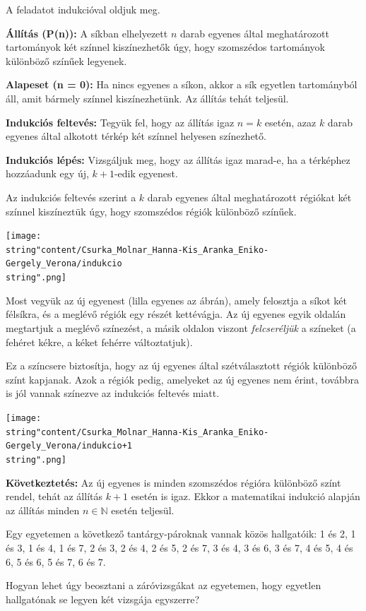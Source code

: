 \begin{solution}
	A feladatot indukcióval oldjuk meg.
	
	\textbf{Állítás (P(n)):} A síkban elhelyezett $n$ darab egyenes által
	meghatározott tartományok két színnel kiszínezhetők úgy, hogy szomszédos
	tartományok különböző színűek legyenek.
	
	\textbf{Alapeset (n = 0):} Ha nincs egyenes a síkon, akkor a sík egyetlen
	tartományból áll, amit bármely színnel kiszínezhetünk. Az állítás
	tehát teljesül.
	
	\textbf{Indukciós feltevés:} Tegyük fel, hogy az állítás igaz $n=k$
	esetén, azaz $k$ darab egyenes által alkotott térkép két színnel
	helyesen színezhető.
	
	\textbf{Indukciós lépés:} Vizsgáljuk meg, hogy az állítás igaz marad-e,
	ha a térképhez hozzáadunk egy új, $k+1$-edik egyenest.
	
	Az indukciós feltevés szerint a $k$ darab egyenes által meghatározott
	régiókat két színnel kiszíneztük úgy, hogy szomszédos régiók különböző
	színűek.
	\begin{center}
		\texttt{[image: \\string"content/Csurka\_Molnar\_Hanna-Kis\_Aranka\_Eniko-Gergely\_Verona/indukcio\\string".png]} 
		\par\end{center}
	Most vegyük az új egyenest (lilla egyenes az ábrán), amely felosztja
	a síkot két félsíkra, és a meglévő régiók egy részét kettévágja. Az
	új egyenes egyik oldalán megtartjuk a meglévő színezést, a másik oldalon
	viszont \textit{felcseréljük} a színeket (a fehéret kékre, a kéket
	fehérre változtatjuk).
	
	Ez a színcsere biztosítja, hogy az új egyenes által szétválasztott
	régiók különböző színt kapjanak. Azok a régiók pedig, amelyeket az
	új egyenes nem érint, továbbra is jól vannak színezve az indukciós
	feltevés miatt.
	\begin{center}
		\texttt{[image: \\string"content/Csurka\_Molnar\_Hanna-Kis\_Aranka\_Eniko-Gergely\_Verona/indukcio+1\\string".png]} 
	\end{center}
	\medskip{}
	
	\textbf{Következtetés:} Az új egyenes is minden szomszédos régióra
	különböző színt rendel, tehát az állítás $k+1$ esetén is igaz. Ekkor
	a matematikai indukció alapján az állítás minden $n\in\mathbb{N}$
	esetén teljesül. 
\end{solution}
\begin{problem}
	Egy egyetemen a következő tantárgy-pároknak vannak közös
	hallgatóik: 1 és 2, 1 és 3, 1 és 4, 1 és 7, 2 és 3, 2 és 4, 2 és 5,
	2 és 7, 3 és 4, 3 és 6, 3 és 7, 4 és 5, 4 és 6, 5 és 6, 5 és 7, 6
	és 7.
	
	Hogyan lehet úgy beosztani a záróvizsgákat az egyetemen, hogy egyetlen
	hallgatónak se legyen két vizsgája egyszerre? 
\end{problem}

